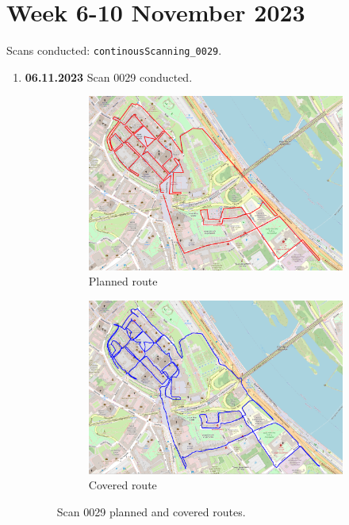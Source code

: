 \documentclass[a4paper,12pt]{article}
\begin{document}
\section{Week 6-10 November 2023}
Scans conducted: \verb|continousScanning_0029|.\\
\begin{enumerate}
	\item \textbf{06.11.2023} Scan 0029 conducted.
	\begin{figure}[H]
		\centering
		\begin{subfigure}{.95\textwidth}
			\centering
			\includegraphics[width=1\linewidth]{route_p29}
			\caption{Planned route}
			\label{fig:a29}
		\end{subfigure}%
		\linebreak
		\begin{subfigure}{.95\textwidth}
			\centering
			\includegraphics[width=1\linewidth]{route_c29}
			\caption{Covered route}
			\label{fig:b29}
		\end{subfigure}
		\caption{Scan 0029 planned and covered routes.}
		\label{fig:fig29}
	\end{figure}
\end{enumerate}
\end{document}
